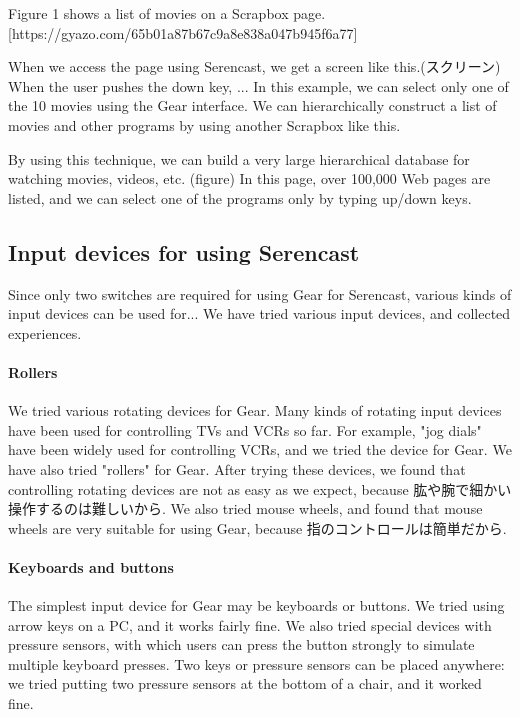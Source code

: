 \documentclass{article}
\begin{document}
Figure 1 shows a list of movies on a Scrapbox page.
[https://gyazo.com/65b01a87b67c9a8e838a047b945f6a77]

When we access the page using Serencast, we get a screen like this.(スクリーン)
When the user pushes the down key, ...
In this example, we can select only one of the 10 movies using the Gear interface.
We can hierarchically construct a list of movies and other programs by using another Scrapbox like this.

By using this technique, we can build a very large hierarchical database for watching movies, videos, etc.
(figure)
In this page, over 100,000 Web pages are listed, and we can select one of the programs only by typing up/down keys.

\subsection{Input devices for using Serencast}

 Since only two switches are required for using Gear for Serencast, various kinds of input devices can be used for...
 We have tried various input devices, and collected experiences.

\paragraph{Rollers}
  We tried various rotating devices for Gear.
  Many kinds of rotating input devices have been used for controlling TVs and VCRs so far.
  For example, "jog dials" have been widely used for controlling VCRs, and we tried the device for Gear.
  We have also tried "rollers" for Gear.
  After trying these devices, we found that controlling rotating devices are not as easy as we expect, because 肱や腕で細かい操作するのは難しいから.
  We also tried mouse wheels, and found that mouse wheels are very suitable for using Gear, because 指のコントロールは簡単だから.

\paragraph{Keyboards and buttons}
  The simplest input device for Gear may be keyboards or buttons.
  We tried using arrow keys on a PC, and it works fairly fine.
  We also tried special devices with pressure sensors, with which users can press the button strongly to simulate multiple keyboard presses.
  Two keys or pressure sensors can be placed anywhere: we tried putting two pressure sensors at the bottom of a chair, and it worked fine.
\end{document}

